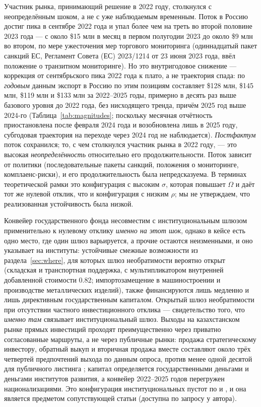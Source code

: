 \documentclass[12pt]{article}
\begin{document}
Участник рынка, принимающий решение в 2022 году, столкнулся с неопределённым шоком, а не с
уже наблюдаемым временным. Поток в Россию достиг пика в сентябре 2022 года и упал более чем
на треть во второй половине 2023 года — с около \$15 млн в месяц в первом полугодии 2023 до
около \$9 млн во втором, по мере ужесточения мер торгового мониторинга (одиннадцатый пакет
санкций ЕС, Регламент Совета (ЕС) 2023/1214 от 23 июня 2023 года, ввёл положение о
транзитном мониторинге). Но это внутригодовое снижение — коррекция от сентябрьского пика
2022 года к плато, а не траектория спада: по \emph{годовым} данным экспорт в Россию по этим
позициям составляет \$128 млн, \$145 млн, \$119 млн и \$133 млн за 2022--2025 годы, примерно
в десять раз выше базового уровня до 2022 года, без нисходящего тренда, причём 2025 год выше
2024-го (Таблица~\ref{tab:magnitudes}; поскольку месячная отчётность приостановлена после
февраля 2024 года и возобновлена лишь в 2025 году, субгодовая траектория на переходе через
2024 год не наблюдается). \emph{Постфактум} поток сохранился; то, с чем столкнулся участник
рынка в 2022 году, — это высокая \emph{неопределённость} относительно его продолжительности.
Поток зависит от политики (последовательные пакеты санкций, положения о мониторинге,
комплаенс-риски), и его продолжительность была непредсказуема. В терминах теоретической
рамки это конфигурация с высоким $\sigma$, которая повышает $\Omega$ и даёт тот же нулевой
отклик, что и конфигурация с низким $\rho$; мы не утверждаем, что реализованная устойчивость
была низкой.

Конвейер государственного фонда несовместим с институциональным шлюзом применительно к
нулевому отклику \emph{именно на этот шок}, однако в кейсе есть одно место, где один шлюз
варьируется, а прочие остаются неизменными, и оно указывает на институты: устойчивые
смежные возможности из раздела~\ref{sec:where}, для которых шлюз необратимости вероятно
открыт (складская и транспортная поддержка, с мультипликатором внутренней добавленной
стоимости 0.82; импортозамещение в машиностроении и производстве металлических изделий),
также финансируются лишь медленно и лишь директивным государственным капиталом. Открытый
шлюз необратимости при отсутствии частного инвестиционного отклика — свидетельство того,
что \emph{именно там} связывает институциональный шлюз. Выходы на казахстанском рынке
прямых инвестиций проходят преимущественно через приватно согласованные маршруты, а не через
публичные рынки: продажа стратегическому инвестору, обратный выкуп и вторичная продажа
вместе составляют около трёх четвертей предпочтений выхода по данным опроса, против менее
одной десятой для публичного листинга \citep{qicaifcifc2026pe}; капитал определяется
государственными деньгами и деньгами институтов развития, а конвейер 2022--2025 годов
перегружен национализациями. Это конфигурация институциональных пустот по
\citet{khannapalepu2000} и \citet{rajanzingales1998}, и она является предметом сопутствующей
статьи (доступна по запросу у автора).
\end{document}

